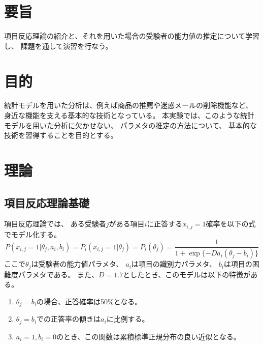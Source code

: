 \documentclass[12pt]{jarticle}
\begin{document}



\section{要旨}
項目反応理論の紹介と、それを用いた場合の受験者の能力値の推定について学習し、
課題を通して演習を行なう。

\section{目的}
統計モデルを用いた分析は、例えば商品の推薦や迷惑メールの削除機能など、
身近な機能を支える基本的な技術となっている。
本実験では、このような統計モデルを用いた分析に欠かせない、
パラメタの推定の方法について、
基本的な技術を習得することを目的とする。

\section{理論}
\subsection{項目反応理論基礎}
項目反応理論では、
ある受験者$j$がある項目$i$に正答する$x_{i,j}=1$確率を以下の式でモデル化する。
\begin{equation}
    P(x_{i,j}=1|\theta_j,a_i,b_i)=P_i(x_{i,j}=1|\theta_j)=P_i(\theta_j)=\frac{1}{1+\exp\{-Da_i(\theta_j -b_i)\}}
\end{equation}
ここで$\theta_j$は受験者の能力値パラメタ、
$a_i$は項目の識別力パラメタ、
$b_i$は項目の困難度パラメタである。
また、$D=1.7$としたとき、このモデルは以下の特徴がある。
\begin{enumerate}
    \item $\theta_j=b_i$の場合、正答確率は50$\%$となる。
    \item $\theta_j=b_i$での正答率の傾きは$a_i$に比例する。
    \item $a_i=1,b_i=0$のとき、この関数は累積標準正規分布の良い近似となる。
\end{enumerate}
\end{document}
